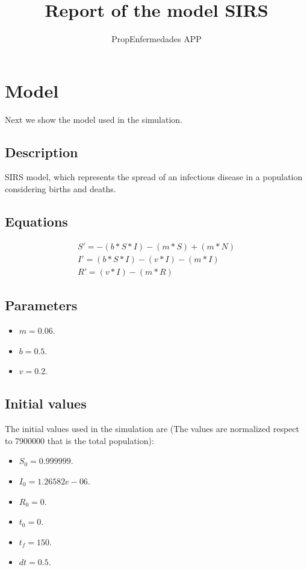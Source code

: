 \documentclass{article}
\title{Report of the model SIRS}
\author{PropEnfermedades APP}
\date{}
\begin{document}
\maketitle
\section{Model}
Next we show the model used in the simulation.
\subsection*{Description}
SIRS model, which represents the spread of an infectious disease in a population considering births and deaths.
\subsection*{Equations}
\begin{equation}
\begin{split}
S' = -(b * S * I) - (m * S) + (m * N) \\ I' = (b * S * I) - (v * I) - (m * I) \\ R' = (v * I) - (m * R)
\end{split}
\end{equation}
\subsection*{Parameters}
\begin{itemize}
\item $m = 0.06$. 
\item $b = 0.5$. 
\item $v = 0.2$. 
\end{itemize}
\subsection*{Initial values}
The initial values used in the simulation are (The values are normalized respect to 7900000 that is the total population):
\begin{itemize}
\item $S_0 = 0.999999$. 
\item $I_0 = 1.26582e-06$. 
\item $R_0 = 0$. 
\item $t_0 = 0$. 
\item $t_f = 150$. 
\item $dt = 0.5$. 
\end{itemize}
\end{document}
